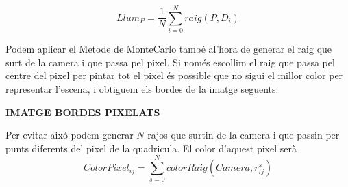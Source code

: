 \documentclass{article}
\begin{document}
\begin{equation}
   Llum_P= \frac{1}{N}\sum_{i=0}^{N} raig(P, D_i)
\end{equation}



Podem aplicar el Metode de MonteCarlo també al'hora de generar el raig que surt de la camera i que passa pel pixel. Si només
escollim el raig que passa pel centre del pixel per pintar tot el pixel és possible que no sigui el millor color per representar
l'escena, i obtiguem els bordes de la imatge seguents: 


\textbf{IMATGE BORDES PIXELATS} 



Per evitar aixó podem generar $N$ rajos que surtin de la camera i que passin per punts diferents del pixel de la quadricula. El
color d'aquest pixel serà
\begin{equation}
   ColorPixel_{ij}= \sum_{s=0}^N colorRaig(Camera,r^s_{ij})
\end{equation}
\end{document}
